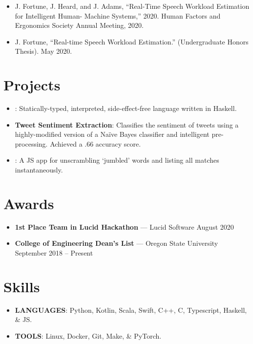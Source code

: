 \documentclass{article}
\providecommand{\tightlist}{%
  \setlength{\itemsep}{0pt}\setlength{\parskip}{0pt}}
\let\defaultref\href
\renewcommand{\href}[2]{%
  \defaultref{#1}{\underline{\smash{#2}}}
}
\begin{document}
\begin{itemize}
\tightlist
\item
  J. Fortune, J. Heard, and J. Adams, ``Real-Time Speech Workload
  Estimation for Intelligent Human- Machine Systems,'' 2020. Human
  Factors and Ergonomics Society Annual Meeting, 2020.
\item
  J. Fortune, ``Real-time Speech Workload Estimation.'' (Undergraduate
  Honors Thesis). May 2020.
\end{itemize}

\hypertarget{projects}{%
\section{Projects}\label{projects}}

\begin{itemize}
\tightlist
\item
  \textbf{\href{https://github.com/julianfortune/CS381Project}{Functional-C}}:
  Statically-typed, interpreted, side-effect-free language written in
  Haskell.
\item
  \textbf{Tweet Sentiment Extraction}: Classifies the sentiment of
  tweets using a highly-modified version of a Naïve Bayes classifier and
  intelligent pre-processing. Achieved a .66 accuracy score.
\item
  \textbf{\href{https://julianfortune.com/unjumble/}{Jumble}}: A JS app
  for unscrambling `jumbled' words and listing all matches
  instantaneously.
\end{itemize}

\hypertarget{awards}{%
\section{Awards}\label{awards}}

\begin{itemize}
\tightlist
\item
  \textbf{1st Place Team in Lucid Hackathon} --- Lucid Software August
  2020
\item
  \textbf{College of Engineering Dean's List} --- Oregon State
  University September 2018 -- Present
\end{itemize}

\hypertarget{skills}{%
\section{Skills}\label{skills}}

\begin{itemize}
\item
  \textbf{LANGUAGES}: Python, Kotlin, Scala, Swift, C++, C, Typescript,
  Haskell, \& JS.
\item
  \textbf{TOOLS}: Linux, Docker, Git, Make, \& PyTorch.
\end{itemize}
\end{document}
